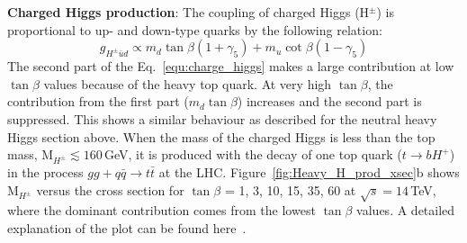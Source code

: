 \noindent \textbf{Charged Higgs production}:
The coupling of charged Higgs (H$^{\pm}$) is proportional to up- and down-type quarks by the following relation:
\begin{equation}\label{equ:charge_higgs}
g_{H^{\pm}\bar{u}d} \propto m_{d}\tan\beta\left(1+\gamma_{5}\right) + m_{u}\cot\beta\left(1-\gamma_{5}\right)
\end{equation} 
The second part of the Eq.~\ref{equ:charge_higgs} makes a large contribution at low $\tan\beta$ values because of the heavy top quark. At very high $\tan\beta$, the contribution from the first part ($m_{d}\tan\beta$) increases and the second part is suppressed. This shows a similar behaviour as described for the neutral heavy Higgs section above. When the mass of the charged Higgs is less than the top mass, M$_{H^{\pm}} \lesssim 160$\,GeV, it is produced with the decay of one top quark ($t\rightarrow bH^{+}$) in the process $gg + q\bar{q}\rightarrow t\bar{t}$ at the LHC. Figure~\ref{fig:Heavy_H_prod_xsec}b shows M$_{H^{\pm}}$ versus the cross section for $\tan\beta$ = 1, 3, 10, 15, 35, 60 at $\sqrt{s} = 14$\,TeV, where the dominant contribution comes from the lowest $\tan\beta$ values. A detailed explanation of the plot can be found here~\cite{Djouadi:2015jea}.

